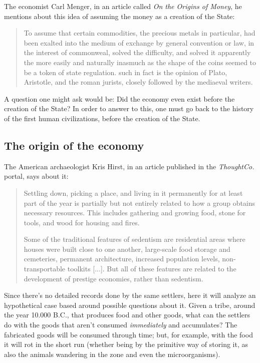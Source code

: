 \documentclass[12pt,a4paper,twoside]{book}
\begin{document}
The economist Carl Menger, in an article called \textit{On the Origins of Money}, he mentions about this idea of assuming the money as a creation of the State:

\begin{quotation}
To assume that certain commodities, the precious metals in particular, had been exalted into the medium of exchange by general convention or law, in the interest of commonweal, solved the difficulty, and solved it apparently the more easily and naturally inasmuch as the shape of the coins seemed to be a token of state regulation. such in fact is the opinion of Plato, Aristotle, and the roman jurists, closely followed by the mediaeval writers.  \cite[p. 16]{menger:origins}
\end{quotation}

A question one might ask would be: Did the economy even exist before the creation of the State? In order to answer to this, one must go back to the history of the first human civilizations, before the creation of the State.

\subsection{The origin of the economy}
The American archaeologist Kris Hirst, in an article published in the \textit{ThoughtCo.} portal, says about it:

\begin{quotation}
Settling down, picking a place, and living in it permanently for at least part of the year is partially but not entirely related to how a group obtains necessary resources. This includes gathering and growing food, stone for tools, and wood for housing and fires.

Some of the traditional features of sedentism are residential areas where houses were built close to one another, large-scale food storage and cemeteries, permanent architecture, increased population levels, non-transportable toolkits [...]. But all of these features are related to the development of prestige economies, rather than sedentism. \cite{krishirst}
\end{quotation}

Since there's no detailed records done by the same settlers, here it will analyze an hypothetical case based around possible questions about it. Given a tribe, around the year 10.000 B.C., that produces food and other goods, what can the settlers do with the goods that aren't consumed \textit{immediately} and accumulates? The fabricated goods will be consumed through time; but, for example, with the food it will rot in the short run (whether being by the primitive way of storing it, as also the animals wandering in the zone and even the microorganisms).
\end{document}
